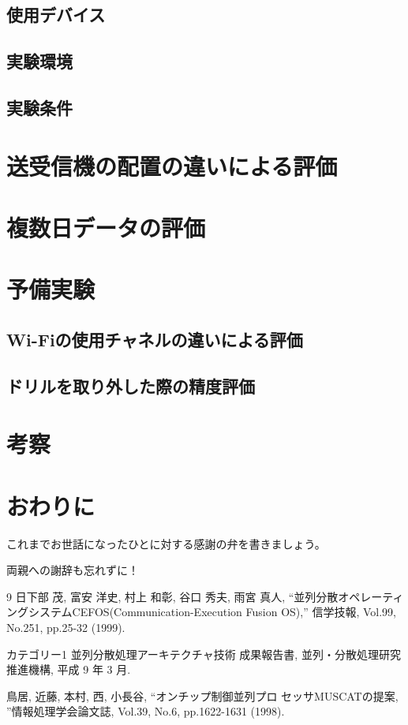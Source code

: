 \documentclass[uplatex, 12pt]{ujbook}
\begin{document}
\section{使用デバイス}
\section{実験環境}
\section{実験条件}

\chapter{送受信機の配置の違いによる評価}


\chapter{複数日データの評価}

\chapter{予備実験}
\section{Wi-Fiの使用チャネルの違いによる評価}
\section{ドリルを取り外した際の精度評価}

\chapter{考察}

\chapter{おわりに}


\acknowledgment
これまでお世話になったひとに対する感謝の弁を書きましょう。

両親への謝辞も忘れずに！


\begin{thebibliography}{9}
 日下部 茂, 富安 洋史, 村上 和彰, 谷口 秀夫, 雨宮 真人,
``並列分散オペレーティングシステムCEFOS(Communication-Execution Fusion
        OS),''
信学技報, Vol.99, No.251, pp.25-32 (1999).

カテゴリー1 並列分散処理アーキテクチャ技術 成果報告書,
並列・分散処理研究推進機構, 平成 9 年 3 月.

 鳥居, 近藤, 本村, 西, 小長谷, ``オンチップ制御並列プロ
        セッサMUSCATの提案, ''情報処理学会論文誌, Vol.39, No.6,
 pp.1622-1631 (1998).
\end{thebibliography}
\end{document}
